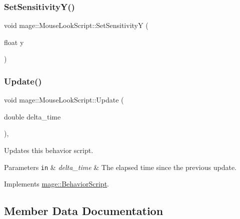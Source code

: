 \hypertarget{classmage_1_1_mouse_look_script_a8e26c1611c8f88fd848506d215a07533}{}\label{classmage_1_1_mouse_look_script_a8e26c1611c8f88fd848506d215a07533} 
\subsubsection{\texorpdfstring{Set\+Sensitivity\+Y()}{SetSensitivityY()}}
{\footnotesize\ttfamily void mage\+::\+Mouse\+Look\+Script\+::\+Set\+SensitivityY (\begin{DoxyParamCaption}\item[{float}]{y }\end{DoxyParamCaption})}

\hypertarget{classmage_1_1_mouse_look_script_a7962403a78c02b2fe64e8f06f6319312}{}\label{classmage_1_1_mouse_look_script_a7962403a78c02b2fe64e8f06f6319312} 
\subsubsection{\texorpdfstring{Update()}{Update()}}
{\footnotesize\ttfamily void mage\+::\+Mouse\+Look\+Script\+::\+Update (\begin{DoxyParamCaption}\item[{double}]{delta\+\_\+time }\end{DoxyParamCaption})\hspace{0.3cm}{\ttfamily [override]}, {\ttfamily [virtual]}}

Updates this behavior script.


\begin{DoxyParams}[1]{Parameters}
\mbox{\tt in}  & {\em delta\+\_\+time} & The elapsed time since the previous update. \\
\hline
\end{DoxyParams}


Implements \hyperlink{classmage_1_1_behavior_script_a905b6c83640cb91d19fecab3435f6feb}{mage\+::\+Behavior\+Script}.



\subsection{Member Data Documentation}
\hypertarget{classmage_1_1_mouse_look_script_ab5df1b96d5860a9b8f30256e7c89b26b}{}\label{classmage_1_1_mouse_look_script_ab5df1b96d5860a9b8f30256e7c89b26b} 
